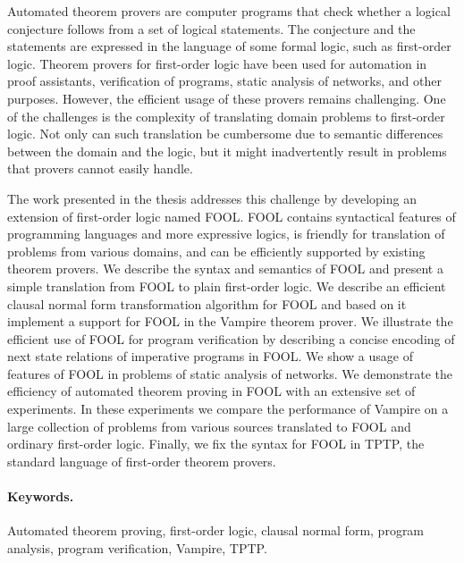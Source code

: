 Automated theorem provers are computer programs that check whether a logical conjecture follows from a set of logical statements. The conjecture and the statements are expressed in the language of some formal logic, such as first-order logic. Theorem provers for first-order logic have been used for automation in proof assistants, verification of programs, static analysis of networks, and other purposes. However, the efficient usage of these provers remains challenging. One of the challenges is the complexity of translating domain problems to first-order logic. Not only can such translation be cumbersome due to semantic differences between the domain and the logic, but it might inadvertently result in problems that provers cannot easily handle.

The work presented in the thesis addresses this challenge by developing an extension of first-order logic named FOOL. FOOL contains syntactical features of programming languages and more expressive logics, is friendly for translation of problems from various domains, and can be efficiently supported by existing theorem provers. We describe the syntax and semantics of FOOL and present a simple translation from FOOL to plain first-order logic. We describe an efficient clausal normal form transformation algorithm for FOOL and based on it implement a support for FOOL in the Vampire theorem prover. We illustrate the efficient use of FOOL for program verification by describing a concise encoding of next state relations of imperative programs in FOOL. We show a usage of features of FOOL in problems of static analysis of networks. We demonstrate the efficiency of automated theorem proving in FOOL with an extensive set of experiments. In these experiments we compare the performance of Vampire on a large collection of problems from various sources translated to FOOL and ordinary first-order logic. Finally, we fix the syntax for FOOL in TPTP, the standard language of first-order theorem provers.

\vfill

\paragraph{Keywords.} Automated theorem proving, first-order logic, clausal normal form, program analysis, program verification, Vampire, TPTP.